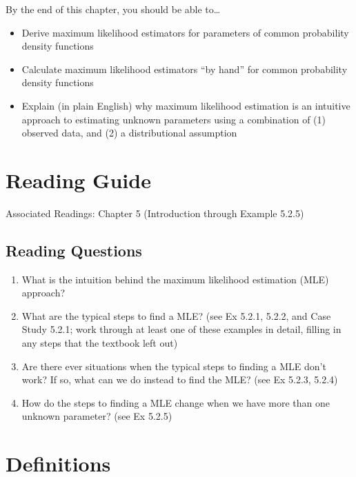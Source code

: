 \documentclass[
  letterpaper,
  DIV=11,
  numbers=noendperiod]{scrreprt}
\begin{document}
By the end of this chapter, you should be able to\ldots{}

\begin{itemize}
\item
  Derive maximum likelihood estimators for parameters of common
  probability density functions
\item
  Calculate maximum likelihood estimators ``by hand'' for common
  probability density functions
\item
  Explain (in plain English) why maximum likelihood estimation is an
  intuitive approach to estimating unknown parameters using a
  combination of (1) observed data, and (2) a distributional assumption
\end{itemize}

\hypertarget{reading-guide-1}{%
\section{Reading Guide}\label{reading-guide-1}}

Associated Readings: Chapter 5 (Introduction through Example 5.2.5)

\hypertarget{reading-questions-1}{%
\subsection{Reading Questions}\label{reading-questions-1}}

\begin{enumerate}
\def\labelenumi{\arabic{enumi}.}
\item
  What is the intuition behind the maximum likelihood estimation (MLE)
  approach?
\item
  What are the typical steps to find a MLE? (see Ex 5.2.1, 5.2.2, and
  Case Study 5.2.1; work through at least one of these examples in
  detail, filling in any steps that the textbook left out)
\item
  Are there ever situations when the typical steps to finding a MLE
  don't work? If so, what can we do instead to find the MLE? (see Ex
  5.2.3, 5.2.4)
\item
  How do the steps to finding a MLE change when we have more than one
  unknown parameter? (see Ex 5.2.5)
\end{enumerate}

\hypertarget{definitions-1}{%
\section{Definitions}\label{definitions-1}}
\end{document}

